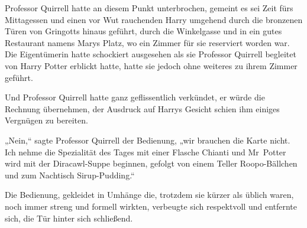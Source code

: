 Professor Quirrell hatte an diesem Punkt unterbrochen, gemeint es sei Zeit fürs Mittagessen und einen vor Wut rauchenden Harry umgehend durch die bronzenen Türen von Gringotts hinaus geführt, durch die Winkelgasse und in ein gutes Restaurant namens Marys Platz, wo ein Zimmer für sie reserviert worden war. Die Eigentümerin hatte schockiert ausgesehen als sie Professor Quirrell begleitet von Harry Potter erblickt hatte, hatte sie jedoch ohne weiteres zu ihrem Zimmer geführt.

Und Professor Quirrell hatte ganz geflissentlich verkündet, er würde die Rechnung übernehmen, der Ausdruck auf Harrys Gesicht schien ihm einiges Vergnügen zu bereiten.

„Nein,“ sagte Professor Quirrell der Bedienung, „wir brauchen die Karte nicht. Ich nehme die Spezialität des Tages mit einer Flasche Chianti und Mr~Potter wird mit der Diracawl-Suppe beginnen, gefolgt von einem Teller Roopo-Bällchen und zum Nachtisch Sirup-Pudding.“

Die Bedienung, gekleidet in Umhänge die, trotzdem sie kürzer als üblich waren, noch immer streng und formell wirkten, verbeugte sich respektvoll und entfernte sich, die Tür hinter sich schließend.

